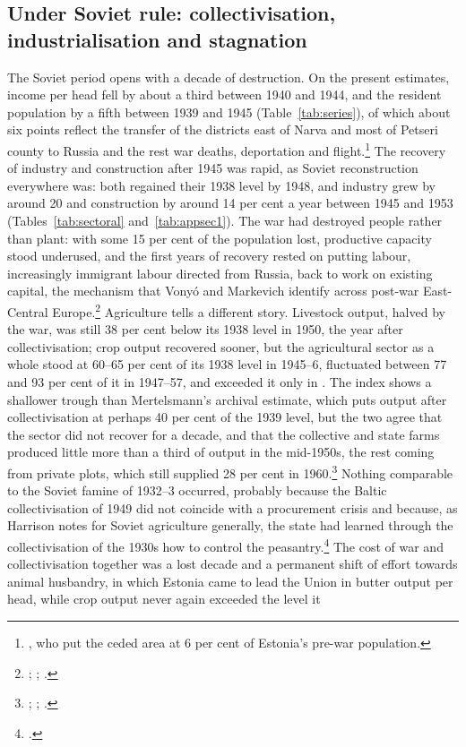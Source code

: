 





\subsection{Under Soviet rule: collectivisation, industrialisation and stagnation}

The Soviet period opens with a decade of destruction. On the present estimates, income per head fell by about a third between 1940 and 1944, and the resident population by a fifth between 1939 and 1945 (Table~\ref{tab:series}), of which about six points reflect the transfer of the districts east of Narva and most of Petseri county to Russia and the rest war deaths, deportation and flight.\footnote{\autocite[74--5]{years_of_dependence}, who put the ceded area at 6 per cent of Estonia's pre-war population.} The recovery of industry and construction after 1945 was rapid, as Soviet reconstruction everywhere was: both regained their 1938 level by 1948, and industry grew by around 20 and construction by around 14 per cent a year between 1945 and 1953 (Tables~\ref{tab:sectoral} and~\ref{tab:appsec1}). The war had destroyed people rather than plant: with some 15 per cent of the population lost, productive capacity stood underused, and the first years of recovery rested on putting labour, increasingly immigrant labour directed from Russia, back to work on existing capital, the mechanism that Vonyó and Markevich identify across post-war East-Central Europe.\footnote{\autocite[108]{years_of_dependence}; \autocite[290]{vonyoinmorys2021}; \autocite[154--5]{kasekamp2010}.} Agriculture tells a different story. Livestock output, halved by the war, was still 38 per cent below its 1938 level in 1950, the year after collectivisation; crop output recovered sooner, but the agricultural sector as a whole stood at 60--65 per cent of its 1938 level in 1945--6, fluctuated between 77 and 93 per cent of it in 1947--57, and exceeded it only in . The index shows a shallower trough than Mertelsmann's archival estimate, which puts output after collectivisation at perhaps 40 per cent of the 1939 level, but the two agree that the sector did not recover for a decade, and that the collective and state farms produced little more than a third of output in the mid-1950s, the rest coming from private plots, which still supplied 28 per cent in 1960.\footnote{\autocite[156--8]{olaf_stalin}; \autocite[257]{klesment2009}; \autocite[160]{hansen1994}.} Nothing comparable to the Soviet famine of 1932--3 occurred, probably because the Baltic collectivisation of 1949 did not coincide with a procurement crisis and because, as Harrison notes for Soviet agriculture generally, the state had learned through the collectivisation of the 1930s how to control the peasantry.\footnote{\autocite[192--208]{harrison1996}.} The cost of war and collectivisation together was a lost decade and a permanent shift of effort towards animal husbandry, in which Estonia came to lead the Union in butter output per head, while crop output never again exceeded the level it 